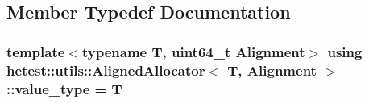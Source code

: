 \subsection{Member Typedef Documentation}
\hypertarget{classhetest_1_1utils_1_1AlignedAllocator_a1de3067f7171cca11e5c3cd10b508998}{
\subsubsection[{value\-\_\-type}]{\setlength{\rightskip}{0pt plus 5cm}template$<$typename T, uint64\-\_\-t Alignment$>$ using {\bf hetest\-::utils\-::\-Aligned\-Allocator}$<$ T, Alignment $>$\-::{\bf value\-\_\-type} =  T}}\label{classhetest_1_1utils_1_1AlignedAllocator_a1de3067f7171cca11e5c3cd10b508998}



